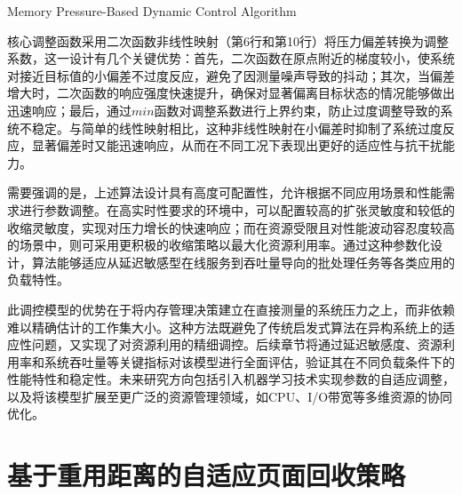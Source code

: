 \begin{algorithm}[htb]
  \caption{Memory Pressure-Based Dynamic Control Algorithm}
  \label{alg:control}
\end{algorithm}
核心调整函数采用二次函数非线性映射（第6行和第10行）将压力偏差转换为调整系数，这一设计有几个关键优势：首先，二次函数在原点附近的梯度较小，使系统对接近目标值的小偏差不过度反应，避免了因测量噪声导致的抖动；其次，当偏差增大时，二次函数的响应强度快速提升，确保对显著偏离目标状态的情况能够做出迅速响应；最后，通过\(min\)函数对调整系数进行上界约束，防止过度调整导致的系统不稳定。与简单的线性映射相比，这种非线性映射在小偏差时抑制了系统过度反应，显著偏差时又能迅速响应，从而在不同工况下表现出更好的适应性与抗干扰能力。

需要强调的是，上述算法设计具有高度可配置性，允许根据不同应用场景和性能需求进行参数调整。在高实时性要求的环境中，可以配置较高的扩张灵敏度和较低的收缩灵敏度，实现对压力增长的快速响应；而在资源受限且对性能波动容忍度较高的场景中，则可采用更积极的收缩策略以最大化资源利用率。通过这种参数化设计，算法能够适应从延迟敏感型在线服务到吞吐量导向的批处理任务等各类应用的负载特性。

此调控模型的优势在于将内存管理决策建立在直接测量的系统压力之上，而非依赖难以精确估计的工作集大小。这种方法既避免了传统启发式算法在异构系统上的适应性问题，又实现了对资源利用的精细调控。后续章节将通过延迟敏感度、资源利用率和系统吞吐量等关键指标对该模型进行全面评估，验证其在不同负载条件下的性能特性和稳定性。未来研究方向包括引入机器学习技术实现参数的自适应调整，以及将该模型扩展至更广泛的资源管理领域，如CPU、I/O带宽等多维资源的协同优化。

\section{基于重用距离的自适应页面回收策略}
\label{sec:基于重用距离的冷热页面优化}

